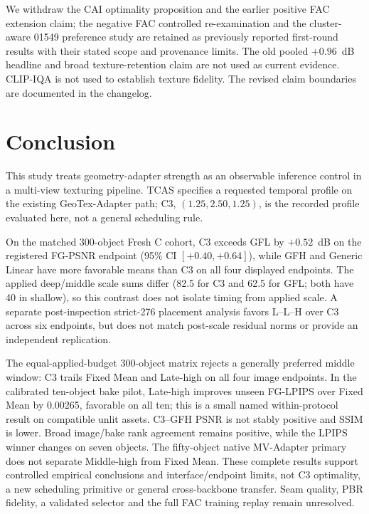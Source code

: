 \documentclass[times,twocolumn,final]{elsarticle}
\begin{document}
We withdraw the CAI optimality proposition and the earlier positive FAC extension claim; the negative FAC controlled re-examination and the cluster-aware 01549 preference study are retained as previously reported first-round results with their stated scope and provenance limits. The old pooled $+0.96$~dB headline and broad texture-retention claim are not used as current evidence. CLIP-IQA is not used to establish texture fidelity. The revised claim boundaries are documented in the changelog.

\section{Conclusion}
\label{sec:conclusion}

This study treats geometry-adapter strength as an observable inference control in a multi-view texturing pipeline. TCAS specifies a requested temporal profile on the existing GeoTex-Adapter path; C3, $(1.25,2.50,1.25)$, is the recorded profile evaluated here, not a general scheduling rule.

On the matched 300-object Fresh C cohort, C3 exceeds GFL by $+0.52$~dB on the registered FG-PSNR endpoint (95\% CI $[+0.40,+0.64]$), while GFH and Generic Linear have more favorable means than C3 on all four displayed endpoints. The applied deep/middle scale sums differ (82.5 for C3 and 62.5 for GFL; both have 40 in shallow), so this contrast does not isolate timing from applied scale. A separate post-inspection strict-276 placement analysis favors L--L--H over C3 across six endpoints, but does not match post-scale residual norms or provide an independent replication.

The equal-applied-budget 300-object matrix rejects a generally preferred middle window: C3 trails Fixed Mean and Late-high on all four image endpoints. In the calibrated ten-object bake pilot, Late-high improves unseen FG-LPIPS over Fixed Mean by 0.00265, favorable on all ten; this is a small named within-protocol result on compatible unlit assets. C3--GFH PSNR is not stably positive and SSIM is lower. Broad image/bake rank agreement remains positive, while the LPIPS winner changes on seven objects. The fifty-object native MV-Adapter primary does not separate Middle-high from Fixed Mean. These complete results support controlled empirical conclusions and interface/endpoint limits, not C3 optimality, a new scheduling primitive or general cross-backbone transfer. Seam quality, PBR fidelity, a validated selector and the full FAC training replay remain unresolved.
\end{document}
